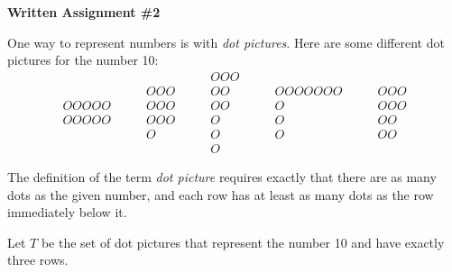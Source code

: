 \documentclass[12pt,letterpaper]{article}
\begin{document}
\setlength{\parskip}{1ex plus 0.5ex minus 0.2ex}
\setlength{\parindent}{0pt}

\pagestyle{fancy}
\lfoot{}
\rfoot{}

\begin{center}
{
\Large
\textbf{Written Assignment \#2}
}
\end{center}

One way to represent numbers is with \emph{dot pictures}.
Here are some different dot pictures for the number 10:
\[
\begin{array}{l}
OOOOO\\ OOOOO
\end{array}
\qquad
\begin{array}{l} OOO\\ OOO \\ OOO \\ O\end{array}
\qquad\begin{array} {l} OOO\\ OO\\ OO\\ O\\ O\\ O\end{array}
\qquad\begin{array}{l} OOOOOOO\\ O \\ O \\ O\end{array}
\qquad\begin{array}{l} OOO\\ OOO\\ OO\\ OO\end{array}
\]

The definition of the term \emph{dot picture} requires exactly that there are as many dots as the given number, and each row has at least as many dots as the row immediately below it.

Let $T$ be the set of dot pictures that represent the number 10 and have exactly three rows.
\end{document}
